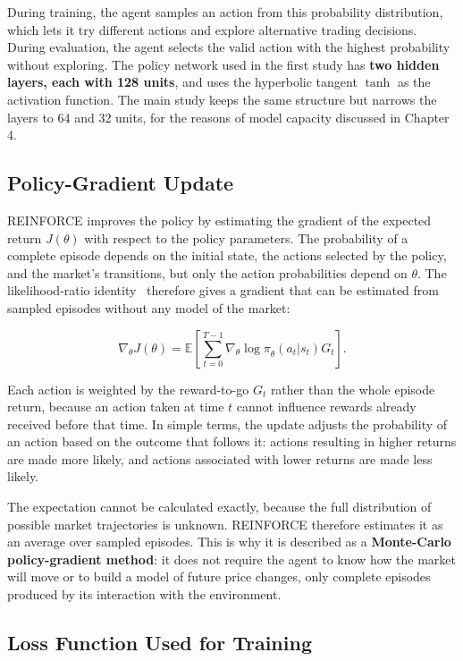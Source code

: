 During training, the agent samples an action from this probability
distribution, which lets it try different actions and explore
alternative trading decisions. During evaluation, the agent selects the
valid action with the highest probability without exploring. The policy
network used in the first study has \textbf{two hidden layers, each with
128 units}, and uses the hyperbolic tangent \(\tanh\) as the activation
function. The main study keeps the same structure but narrows the layers
to 64 and 32 units, for the reasons of model capacity discussed in
Chapter 4.

\subsection{Policy-Gradient Update}

REINFORCE improves the policy by estimating the gradient of the expected
return \(J(\theta)\) with respect to the policy parameters. The
probability of a complete episode depends on the initial state, the
actions selected by the policy, and the market's transitions, but only
the action probabilities depend on \(\theta\). The likelihood-ratio
identity~\cite{williams1992, sutton2018} therefore gives a gradient that
can be estimated from sampled episodes without any model of the market:

\[\nabla_{\theta}J(\theta) = \mathbb{E}\left\lbrack \sum_{t = 0}^{T - 1}\nabla_{\theta}{\log\pi}_{\theta}\left( a_{t}|s_{t} \right)G_{t} \right\rbrack.\]

Each action is weighted by the reward-to-go \(G_{t}\) rather than the
whole episode return, because an action taken at time \(t\) cannot
influence rewards already received before that time. In simple terms,
the update adjusts the probability of an action based on the outcome
that follows it: actions resulting in higher returns are made more
likely, and actions associated with lower returns are made less likely.

The expectation cannot be calculated exactly, because the full
distribution of possible market trajectories is unknown. REINFORCE
therefore estimates it as an average over sampled episodes. This is why
it is described as a \textbf{Monte-Carlo policy-gradient method}: it
does not require the agent to know how the market will move or to build
a model of future price changes, only complete episodes produced by its
interaction with the environment.

\subsection{Loss Function Used for Training}

